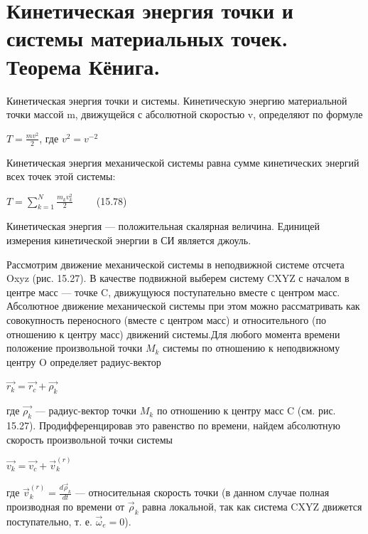 {\section{Кинетическая энергия точки и системы материальных точек. Теорема Кёнига.}
\begin{center}
    \par Кинетическая энергия точки и системы. Кинетическую энергию материальной точки массой m, движущейся с абсолютной скоростью v, определяют по формуле
    \par $T= \frac{mv^2}{2}$, где $v^2=v^{-2}$
    \par Кинетическая энергия механической системы равна сумме кинетических энергий всех точек этой системы:
    \par $ T = \sum_{k=1}^N {\frac{m_kv_k^2}{2}} \qquad$ (15.78)
    \par Кинетическая энергия — положительная скалярная величина. Единицей измерения кинетической энергии в СИ является джоуль.
    \par Рассмотрим движение механической системы в неподвижной системе отсчета Oxyz  (рис. 15.27). В качестве подвижной выберем систему  CXYZ  с началом в центре масс — точке C, движущуюся поступательно вместе  с  центром  масс.  Абсолютное  движение  механической  системы  при этом можно рассматривать как совокупность переносного (вместе с центром масс) и относительного (по отношению к центру масс) движений системы.Для любого момента времени положение произвольной точки $M_k$ системы по отношению к неподвижному центру O определяет радиус-вектор
    \par $\vec{r_k} = \vec{r_c} + \vec {\rho_k}$
    \par где $\vec{\rho_k}$  —  радиус-вектор  точки $M_k$  по  отношению  к  центру  масс  C  (см. рис.  15.27).  Продифференцировав это равенство  по  времени,  найдем  абсолютную скорость произвольной точки системы
    \par $\vec{v_k} = \vec{v_c} + \vec {v}_k^{(r)}$
    \par где  $ \vec {v}_k^{(r)} = \frac{d \vec{\rho}_k}{dt} $  — относительная скорость точки (в данном случае полная производная по времени от $ \vec{\rho}_k$ равна локальной, так как система  CXYZ  движется поступательно, т. е. $ \vec{\omega}_e=0 $).
    \begin{figure}[H]

\end{figure}
\end{center}}
